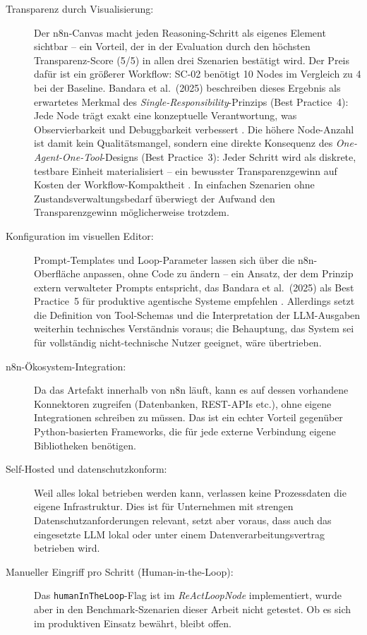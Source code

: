 \documentclass[12pt,a4paper,oneside]{report}
\begin{document}
\begin{description}
  \item[Transparenz durch Visualisierung:] Der n8n-Canvas macht jeden
    Reasoning-Schritt als eigenes Element sichtbar -- ein Vorteil, der in der Evaluation
    durch den höchsten Transparenz-Score (5/5) in allen drei Szenarien bestätigt wird.
    Der Preis dafür ist ein größerer Workflow: SC-02 benötigt 10 Nodes im Vergleich
    zu 4 bei der Baseline. Bandara et al.\ (2025) beschreiben dieses Ergebnis als
    erwartetes Merkmal des \textit{Single-Responsibility}-Prinzips (Best Practice~4):
    Jede Node trägt exakt eine konzeptuelle Verantwortung, was Observierbarkeit und
    Debuggbarkeit verbessert \cite{bandara2025practical}. Die höhere Node-Anzahl ist
    damit kein Qualitätsmangel, sondern eine direkte Konsequenz des
    \textit{One-Agent-One-Tool}-Designs (Best Practice~3): Jeder Schritt wird als
    diskrete, testbare Einheit materialisiert -- ein bewusster Transparenzgewinn auf
    Kosten der Workflow-Kompaktheit \cite{bandara2025practical}. In einfachen Szenarien
    ohne Zustandsverwaltungsbedarf überwiegt der Aufwand den Transparenzgewinn
    möglicherweise trotzdem.

  \item[Konfiguration im visuellen Editor:] Prompt-Templates und Loop-Parameter
    lassen sich über die n8n-Oberfläche anpassen, ohne Code zu ändern -- ein Ansatz,
    der dem Prinzip extern verwalteter Prompts entspricht, das Bandara et al.\ (2025)
    als Best Practice~5 für produktive agentische Systeme empfehlen
    \cite{bandara2025practical}. Allerdings setzt die Definition von Tool-Schemas
    und die Interpretation der LLM-Ausgaben weiterhin technisches Verständnis voraus;
    die Behauptung, das System sei für vollständig nicht-technische Nutzer geeignet,
    wäre übertrieben.

  \item[n8n-Ökosystem-Integration:] Da das Artefakt innerhalb von n8n läuft,
    kann es auf dessen vorhandene Konnektoren zugreifen (Datenbanken, REST-APIs etc.),
    ohne eigene Integrationen schreiben zu müssen. Das ist ein echter Vorteil gegenüber
    Python-basierten Frameworks, die für jede externe Verbindung eigene Bibliotheken
    benötigen.

  \item[Self-Hosted und datenschutzkonform:] Weil alles lokal betrieben werden kann,
    verlassen keine Prozessdaten die eigene Infrastruktur. Dies ist für Unternehmen mit
    strengen Datenschutzanforderungen relevant, setzt aber voraus, dass auch das
    eingesetzte LLM lokal oder unter einem Datenverarbeitungsvertrag betrieben wird.

  \item[Manueller Eingriff pro Schritt (Human-in-the-Loop):] Das
    \texttt{humanInTheLoop}-Flag ist im \textit{ReActLoopNode} implementiert, wurde
    aber in den Benchmark-Szenarien dieser Arbeit nicht getestet. Ob es sich im
    produktiven Einsatz bewährt, bleibt offen.
\end{description}
\end{document}
